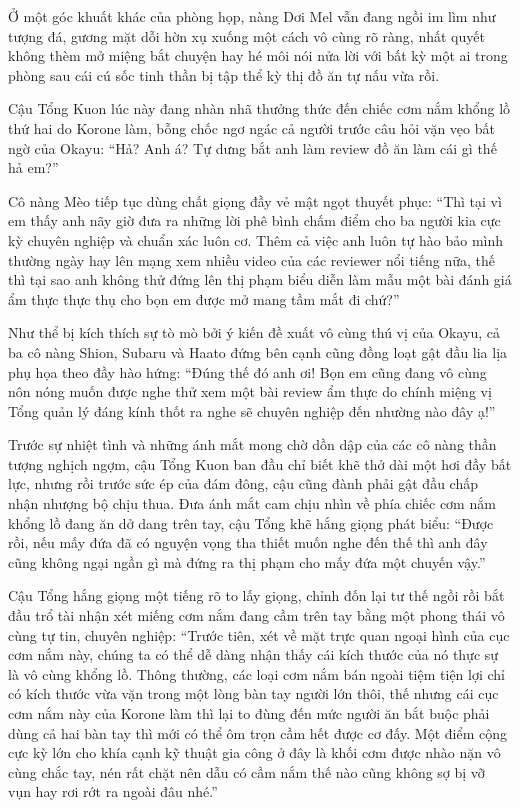 \documentclass[../main.tex]{subfiles}
\begin{document}
Ở một góc khuất khác của phòng họp, nàng Dơi Mel vẫn đang ngồi im lìm như tượng đá, gương mặt dỗi hờn xụ xuống một cách vô cùng rõ ràng, nhất quyết không thèm mở miệng bắt chuyện hay hé môi nói nửa lời với bất kỳ một ai trong phòng sau cái cú sốc tinh thần bị tập thể kỳ thị đồ ăn tự nấu vừa rồi.

Cậu Tổng Kuon lúc này đang nhàn nhã thưởng thức đến chiếc cơm nắm khổng lồ thứ hai do Korone làm, bỗng chốc ngơ ngác cả người trước câu hỏi vặn vẹo bất ngờ của Okayu: ``Hả? Anh á? Tự dưng bắt anh làm review đồ ăn làm cái gì thế hả em?''

Cô nàng Mèo tiếp tục dùng chất giọng đầy vẻ mật ngọt thuyết phục: ``Thì tại vì em thấy anh nãy giờ đưa ra những lời phê bình chấm điểm cho ba người kia cực kỳ chuyên nghiệp và chuẩn xác luôn cơ. Thêm cả việc anh luôn tự hào bảo mình thường ngày hay lên mạng xem nhiều video của các reviewer nổi tiếng nữa, thế thì tại sao anh không thử đứng lên thị phạm biểu diễn làm mẫu một bài đánh giá ẩm thực thực thụ cho bọn em được mở mang tầm mắt đi chứ?''

Như thể bị kích thích sự tò mò bởi ý kiến đề xuất vô cùng thú vị của Okayu, cả ba cô nàng Shion, Subaru và Haato đứng bên cạnh cũng đồng loạt gật đầu lia lịa phụ họa theo đầy hào hứng: ``Đúng thế đó anh ơi! Bọn em cũng đang vô cùng nôn nóng muốn được nghe thử xem một bài review ẩm thực do chính miệng vị Tổng quản lý đáng kính thốt ra nghe sẽ chuyên nghiệp đến nhường nào đây ạ!''

Trước sự nhiệt tình và những ánh mắt mong chờ dồn dập của các cô nàng thần tượng nghịch ngợm, cậu Tổng Kuon ban đầu chỉ biết khẽ thở dài một hơi đầy bất lực, nhưng rồi trước sức ép của đám đông, cậu cũng đành phải gật đầu chấp nhận nhượng bộ chịu thua. Đưa ánh mắt cam chịu nhìn về phía chiếc cơm nắm khổng lồ đang ăn dở dang trên tay, cậu Tổng khẽ hắng giọng phát biểu: ``Được rồi, nếu mấy đứa đã có nguyện vọng tha thiết muốn nghe đến thế thì anh đây cũng không ngại ngần gì mà đứng ra thị phạm cho mấy đứa một chuyến vậy.''

Cậu Tổng hắng giọng một tiếng rõ to lấy giọng, chỉnh đốn lại tư thế ngồi rồi bắt đầu trổ tài nhận xét miếng cơm nắm đang cầm trên tay bằng một phong thái vô cùng tự tin, chuyên nghiệp: ``Trước tiên, xét về mặt trực quan ngoại hình của cục cơm nắm này, chúng ta có thể dễ dàng nhận thấy cái kích thước của nó thực sự là vô cùng khổng lồ. Thông thường, các loại cơm nắm bán ngoài tiệm tiện lợi chỉ có kích thước vừa vặn trong một lòng bàn tay người lớn thôi, thế nhưng cái cục cơm nắm này của Korone làm thì lại to đùng đến mức người ăn bắt buộc phải dùng cả hai bàn tay thì mới có thể ôm trọn cầm hết được cơ đấy. Một điểm cộng cực kỳ lớn cho khía cạnh kỹ thuật gia công ở đây là khối cơm được nhào nặn vô cùng chắc tay, nén rất chặt nên dẫu có cầm nắm thế nào cũng không sợ bị vỡ vụn hay rơi rớt ra ngoài đâu nhé.''
\end{document}
